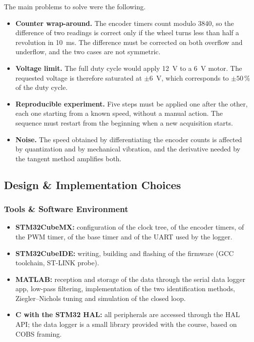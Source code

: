 \documentclass[english]{article}
\begin{document}
\noindent The main problems to solve were the following.

\begin{itemize}[nosep]
  \item \textbf{Counter wrap-around.} The encoder timers count modulo 3840, so the difference of two readings is
        correct only if the wheel turns less than half a revolution in 10~ms. The difference must be corrected on both
        overflow and underflow, and the two cases are not symmetric.
  \item \textbf{Voltage limit.} The full duty cycle would apply 12~V to a 6~V motor. The requested voltage is
        therefore saturated at $\pm6$~V, which corresponds to $\pm50$\,\% of the duty cycle.
  \item \textbf{Reproducible experiment.} Five steps must be applied one after the other, each one starting from a
        known speed, without a manual action. The sequence must restart from the beginning when a new acquisition starts.
  \item \textbf{Noise.} The speed obtained by differentiating the encoder counts is affected by quantization and by
        mechanical vibration, and the derivative needed by the tangent method amplifies both.
\end{itemize}

\subsection{Design \& Implementation Choices}
\label{sec:lab2-code}

\subsubsection{Tools \& Software Environment}

\begin{itemize}[nosep]
  \item \textbf{STM32CubeMX:} configuration of the clock tree, of the encoder timers, of the PWM timer, of the base
        timer and of the UART used by the logger.
  \item \textbf{STM32CubeIDE:} writing, building and flashing of the firmware (GCC toolchain, ST-LINK probe).
  \item \textbf{MATLAB:} reception and storage of the data through the serial data logger app, low-pass filtering,
        implementation of the two identification methods, Ziegler--Nichols tuning and simulation of the closed loop.
  \item \textbf{C with the STM32 HAL:} all peripherals are accessed through the HAL API; the data logger is a small
        library provided with the course, based on COBS framing.
\end{itemize}
\end{document}
